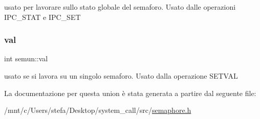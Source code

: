 usato per lavorare sullo stato globale del semaforo. Usato dalle operazioni I\+P\+C\+\_\+\+S\+T\+AT e I\+P\+C\+\_\+\+S\+ET \mbox{\label{unionsemun_ac6121ecb6d04a024e07e12bd71b94031}} 
\subsubsection{\texorpdfstring{val}{val}}
{\footnotesize\ttfamily int semun\+::val}

usato se si lavora su un singolo semaforo. Usato dalla operazione S\+E\+T\+V\+AL 

La documentazione per questa union è stata generata a partire dal seguente file\+:\begin{DoxyCompactItemize}
\item 
/mnt/c/\+Users/stefa/\+Desktop/system\+\_\+call/src/\hyperlink{semaphore_8h}{semaphore.\+h}\end{DoxyCompactItemize}
